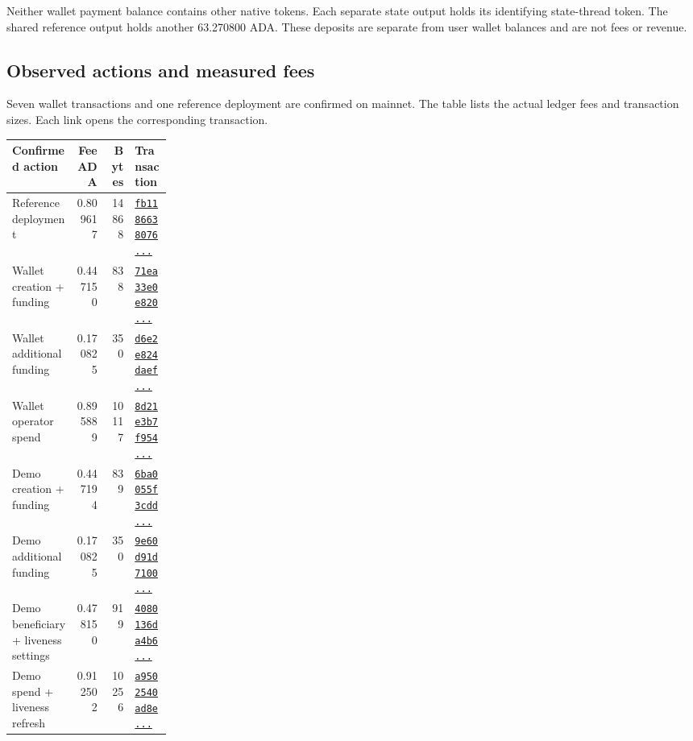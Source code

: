 \documentclass[fontsize=10pt,paper=a4,DIV=16,parskip=half-]{scrartcl}
\newcommand{\hd}[1]{{\sffamily\bfseries\color{brandnavy}#1}}
\begin{document}
Neither wallet payment balance contains other native tokens. Each separate state output holds its identifying state-thread token. The shared reference output holds another 63.270800 ADA. These deposits are separate from user wallet balances and are not fees or revenue.

\subsection*{Observed actions and measured fees}
Seven wallet transactions and one reference deployment are confirmed on mainnet. The table lists the actual ledger fees and transaction sizes. Each link opens the corresponding transaction.

{\small
\begin{tabularx}{\linewidth}{@{}Xrrp{0.23\linewidth}@{}}
\toprule
\hd{Confirmed action} & \hd{Fee ADA} & \hd{Bytes} & \hd{Transaction} \\
\midrule
Reference deployment & 0.809617 & 14868 & \href{https://cardanoscan.io/transaction/fb11866380769867300d1919098c5961473e362d40d03192f5b83c61eb6f0c0d}{\texttt{fb1186638076...}} \\
Wallet creation + funding & 0.447150 & 838 & \href{https://cardanoscan.io/transaction/71ea33e0e820dc4a04c86530d3f994a2f880aa047cdfbe3b68d3e272c33409a8}{\texttt{71ea33e0e820...}} \\
Wallet additional funding & 0.170825 & 350 & \href{https://cardanoscan.io/transaction/d6e2e824daef4347231db51c1a5f0c422a6e3292fab2d514cb5320e86a2cf249}{\texttt{d6e2e824daef...}} \\
Wallet operator spend & 0.895889 & 10117 & \href{https://cardanoscan.io/transaction/8d21e3b7f954262d8da288e97b4067f40cc7ccc94db94a19959d4929350b8732}{\texttt{8d21e3b7f954...}} \\
Demo creation + funding & 0.447194 & 839 & \href{https://cardanoscan.io/transaction/6ba0055f3cddbe2882a7ce1648eddee47e73e65b0cf36b771e375b653e8beb31}{\texttt{6ba0055f3cdd...}} \\
Demo additional funding & 0.170825 & 350 & \href{https://cardanoscan.io/transaction/9e60d91d71008a72ff725e9d1e4b6e07a96d4e7a53046af1af5b8dd217b2d7f2}{\texttt{9e60d91d7100...}} \\
Demo beneficiary + liveness settings & 0.478150 & 919 & \href{https://cardanoscan.io/transaction/4080136da4b64ba642f5b40d017a2181c1edfbf7cd21a48ab38a623225b34871}{\texttt{4080136da4b6...}} \\
Demo spend + liveness refresh & 0.912502 & 10256 & \href{https://cardanoscan.io/transaction/a9502540ad8ef0af445fe99904dc05ccb2d50c785344953a1f146e114424aad9}{\texttt{a9502540ad8e...}} \\
\bottomrule
\end{tabularx}}
\end{document}
